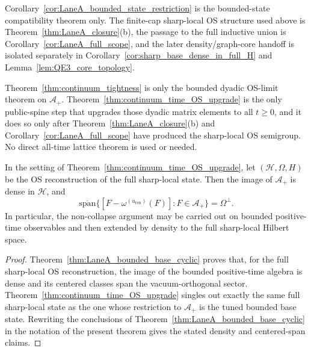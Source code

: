 \begin{remark}
Corollary~\ref{cor:LaneA_bounded_state_restriction} is the bounded-state compatibility theorem only.
The finite-cap sharp-local OS structure used above is Theorem~\ref{thm:LaneA_closure}(b), the passage to the full inductive union is Corollary~\ref{cor:LaneA_full_scope}, and the later density/graph-core handoff is isolated separately in Corollary~\ref{cor:sharp_base_dense_in_full_H} and Lemma~\ref{lem:QE3_core_topology}.
\end{remark}

\begin{remark}
Theorem~\ref{thm:continuum_tightness} is only the bounded dyadic OS-limit theorem on $\mathcal A_+$. Theorem~\ref{thm:continuum_time_OS_upgrade} is the only public-spine step that upgrades those dyadic matrix elements to all $t\ge 0$, and it does so only after Theorem~\ref{thm:LaneA_closure}(b) and Corollary~\ref{cor:LaneA_full_scope} have produced the sharp-local OS semigroup. No direct all-time lattice theorem is used or needed.
\end{remark}

\begin{corollary}\label{cor:sharp_base_dense_in_full_H}
In the setting of Theorem~\ref{thm:continuum_time_OS_upgrade}, let $(\mathcal H,\Omega,H)$ be the OS reconstruction of the full sharp-local state.
Then the image of $\mathcal A_+$ is dense in $\mathcal H$, and
\[
\overline{\mathrm{span}}\{[F-\omega^{(u_{\mathrm{ren}})}(F)]:F\in\mathcal A_+\}=\Omega^\perp.
\]
In particular, the non-collapse argument may be carried out on bounded positive-time observables and then extended by density to the full sharp-local Hilbert space.
\end{corollary}

\begin{proof}
Theorem~\ref{thm:LaneA_bounded_base_cyclic} proves that, for the full sharp-local OS reconstruction, the image of the bounded positive-time algebra is dense and its centered classes span the vacuum-orthogonal sector. Theorem~\ref{thm:continuum_time_OS_upgrade} singles out exactly the same full sharp-local state as the one whose restriction to $\mathcal A_+$ is the tuned bounded base state. Rewriting the conclusions of Theorem~\ref{thm:LaneA_bounded_base_cyclic} in the notation of the present theorem gives the stated density and centered-span claims.
\end{proof}

